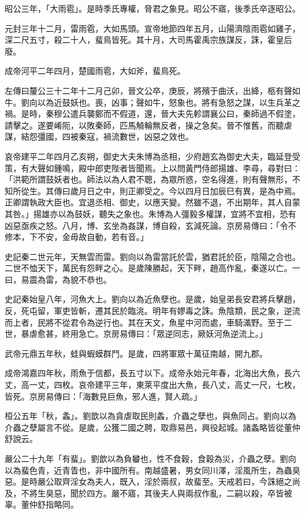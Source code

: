 \begin{pinyinscope}
昭公三年，「大雨雹」。是時季氏專權，脅君之象見。昭公不寤，後季氏卒逐昭公。

元封三年十二月，雷雨雹，大如馬頭。宣帝地節四年五月，山陽濟陰雨雹如雞子，深二尺五寸，殺二十人，蜚鳥皆死。其十月，大司馬霍禹宗族謀反，誅，霍皇后廢。

成帝河平二年四月，楚國雨雹，大如斧，蜚鳥死。

左傳曰釐公三十二年十二月己卯，晉文公卒，庚辰，將殯于曲沃，出絳，柩有聲如牛。劉向以為近鼓妖也。喪，凶事；聲如牛，怒象也。將有急怒之謀，以生兵革之禍。是時，秦穆公遣兵襲鄭而不假道，還，晉大夫先軫謂襄公曰，秦師過不假塗，請擊之。遂要崤阨，以敗秦師，匹馬觭輪無反者，操之急矣。晉不惟舊，而聽虐謀，結怨彊國，四被秦寇，禍流數世，凶惡之效也。

哀帝建平二年四月乙亥朔，御史大夫朱博為丞相，少府趙玄為御史大夫，臨延登受策，有大聲如鍾鳴，殿中郎吏陛者皆聞焉。上以問黃門侍郎揚雄、李尋，尋對曰：「洪範所謂鼓妖者也。師法以為人君不聰，為眾所惑，空名得進，則有聲無形，不知所從生。其傳曰歲月日之中，則正卿受之。今以四月日加辰巳有異，是為中焉。正卿謂執政大臣也。宜退丞相、御史，以應天變。然雖不退，不出期年，其人自蒙其咎。」揚雄亦以為鼓妖，聽失之象也。朱博為人彊毅多權謀，宜將不宜相，恐有凶惡亟疾之怒。八月，博、玄坐為姦謀，博自殺，玄減死論。京房易傳曰：「令不修本，下不安，金毋故自動，若有音。」

史記秦二世元年，天無雲而雷。劉向以為雷當託於雲，猶君託於臣，陰陽之合也。二世不恤天下，萬民有怨畔之心。是歲陳勝起，天下畔，趙高作亂，秦遂以亡。一曰，易震為雷，為貌不恭也。

史記秦始皇八年，河魚大上。劉向以為近魚孽也。是歲，始皇弟長安君將兵擊趙，反，死屯留，軍吏皆斬，遷其民於臨洮。明年有嫪毒之誅。魚陰類，民之象，逆流而上者，民將不從君令為逆行也。其在天文，魚星中河而處，車騎滿野。至于二世，暴虐愈甚，終用急亡。京房易傳曰：「眾逆同志，厥妖河魚逆流上。」

武帝元鼎五年秋，蛙與蝦蟆群鬥。是歲，四將軍眾十萬征南越，開九郡。

成帝鴻嘉四年秋，雨魚于信都，長五寸以下。成帝永始元年春，北海出大魚，長六丈，高一丈，四枚。哀帝建平三年，東萊平度出大魚，長八丈，高丈一尺，七枚，皆死。京房易傳曰：「海數見巨魚，邪人進，賢人疏。」

桓公五年「秋，螽」。劉歆以為貪虐取民則螽，介蟲之孽也，與魚同占。劉向以為介蟲之孽屬言不從。是歲，公獲二國之聘，取鼎易邑，興役起城。諸螽略皆從董仲舒說云。

嚴公二十九年「有蜚」。劉歆以為負蠜也，性不食穀，食穀為災，介蟲之孽。劉向以為蜚色青，近青眚也，非中國所有。南越盛暑，男女同川澤，淫風所生，為蟲臭惡。是時嚴公取齊淫女為夫人，既入，淫於兩叔，故蜚至。天戒若曰，今誅絕之尚及，不將生臭惡，聞於四方。嚴不寤，其後夫人與兩叔作亂，二嗣以殺，卒皆被辜。董仲舒指略同。


\end{pinyinscope}
